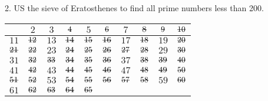 \newpage
\begin{mdframed}[style=darkQuesion]
  2. US the sieve of Eratosthenes to find all prime numbers less than 200.
\end{mdframed}

\begin{mdframed}[style=darkAnswer,frametitle={Joe Starr}]
  \begin{center}
    \begin{tabular}{| c | c | c | c | c | c | c | c | c | c |}
      \hline
      $ $           & $2$           & $3$           & $\msout{4}$   & $5$           & $\msout{6}$   & $7$ & $\msout{8}$ &
      $\msout{9}$   & $\msout{10}$                                                                                        \\
      \hline
      $11$          & $\msout{12}$  & $13$          & $\msout{14}$  & $\msout{15}$  & $\msout{16}$
                    & $17$          & $\msout{18}$  & $19$          & $\msout{20}$                                        \\
      \hline
      $\msout{21}$  & $\msout{22}$  & $23$          & $\msout{24}$  & $\msout{25}$  &
      $\msout{26}$  & $\msout{27}$  & $\msout{28}$  & $29$          & $\msout{30}$                                        \\
      \hline
      $31$          & $\msout{32}$  & $\msout{33}$  & $\msout{34}$  & $\msout{35}$  &
      $\msout{36}$  & $37$          & $\msout{38}$  & $\msout{39}$  & $\msout{40}$                                        \\
      \hline
      $41$          & $\msout{42}$  & $43$          & $\msout{44}$  & $\msout{45}$  & $\msout{46}$
                    & $47$          & $\msout{48}$  & $\msout{49}$  & $\msout{50}$                                        \\
      \hline
      $\msout{51}$  & $\msout{52}$  & $53$          & $\msout{54}$  & $\msout{55}$  &
      $\msout{56}$  & $\msout{57}$  & $\msout{58}$  & $59$          & $\msout{60}$                                        \\
      \hline
      $61$          & $\msout{62}$  & $\msout{63}$  & $\msout{64}$  & $\msout{65}$  &

\end{tabular}
\end{center}
\end{mdframed}
